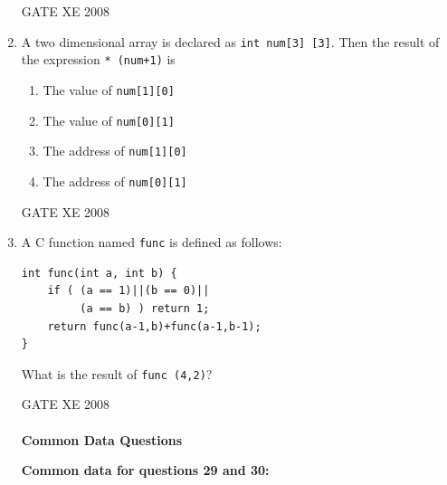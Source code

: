 \documentclass[12pt]{article}
\begin{document}
\begin{enumerate}[label=Q\arabic*.]
\begin{enumerate}[label=(\Alph*)]
\end{enumerate}

GATE XE 2008
\item A two dimensional array is declared as \texttt{int num[3] [3]}. Then the result of the expression \texttt{* (num+1)} is

\begin{enumerate}[label=(\Alph*)]
\item The value of \texttt{num[1][0]}

\item  The value of \texttt{num[0][1]}

\item  The address of \texttt{num[1][0]}

\item  The address of \texttt{num[0][1]}
\end{enumerate}

GATE XE 2008
\item A C function named \texttt{func} is defined as follows:
\begin{verbatim}
int func(int a, int b) {
    if ( (a == 1)||(b == 0)||
         (a == b) ) return 1;
    return func(a-1,b)+func(a-1,b-1);
}

\end{verbatim}
What is the result of \texttt{func (4,2)}?

\begin{enumerate}[label=(\Alph*)]
\end{enumerate}

GATE XE 2008
\\
\\

\noindent \textbf{\large Common Data Questions}

\textbf{Common data for questions 29 and 30: }


\end{enumerate}
\end{document}
